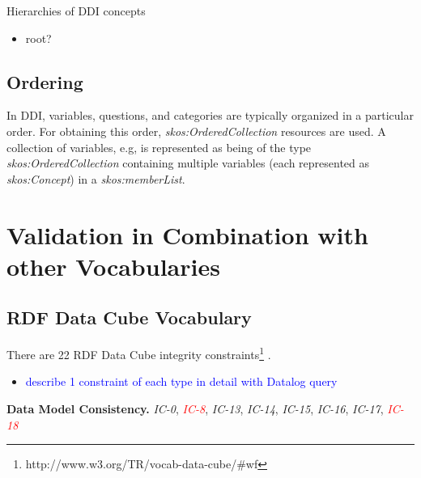 \documentclass{llncs}
\begin{document}
{Hierarchies of DDI concepts

\begin{itemize}
	\item root?
\end{itemize}

\subsection{Ordering}

In DDI, variables, questions, and categories are typically organized in a particular order. 
For obtaining this order, {\em skos:OrderedCollection} resources are used. 
A collection of variables, e.g, is represented as being of the type {\em skos:OrderedCollection} containing multiple variables (each represented as {\em skos:Concept}) in a {\em skos:memberList}. 

\section{Validation in Combination with other Vocabularies}

\subsection{RDF Data Cube Vocabulary}

There are 22 RDF Data Cube integrity constraints\footnote{http://www.w3.org/TR/vocab-data-cube/\#wf} \cite{CyganiakReynolds2014}.

\begin{itemize}
	\item \textcolor{blue}{describe 1 constraint of each type in detail with Datalog query}
\end{itemize}

\textbf{Data Model Consistency.}
{\em IC-0}, \textcolor{red}{{\em IC-8}}, {\em IC-13}, {\em IC-14}, {\em IC-15}, {\em IC-16}, {\em IC-17}, \textcolor{red}{{\em IC-18}}

}
\end{document}
